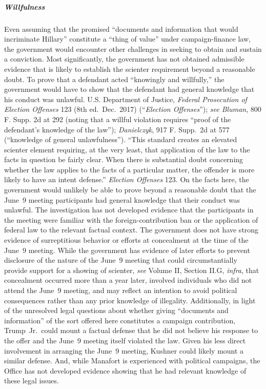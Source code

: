 \subparagraph{Willfulness}
Even assuming that the promised ``documents and information that would incriminate Hillary'' constitute a ``thing of value'' under campaign-finance law, the government would encounter other challenges in seeking to obtain and sustain a conviction.
Most significantly, the government has not obtained admissible evidence that is likely to establish the scienter requirement beyond a reasonable doubt.
To prove that a defendant acted ``knowingly and willfully,'' the government would have to show that the defendant had general knowledge that his conduct was unlawful.
U.S. Department of Justice, \textit{Federal Prosecution of Election Offenses} 123 (8th ed.\ Dec.~2017) (``\textit{Election Offenses}''); \textit{see Bluman}, 800 F. Supp. 2d at 292 (noting that a willful violation requires ``proof of the defendant's knowledge of the law''); \textit{Danielczyk}, 917 F. Supp.~2d at 577 (``knowledge of general unlawfulness'').
``This standard creates an elevated scienter element requiring, at the very least, that application of the law to the facts in question be fairly clear.
When there is substantial doubt concerning whether the law applies to the facts of a particular matter, the offender is more likely to have an intent defense.''
\textit{Election Offenses} 123.
On the facts here, the government would unlikely be able to prove beyond a reasonable doubt that the June~9 meeting participants had general knowledge that their conduct was unlawful.
The investigation has not developed evidence that the participants in the meeting were familiar with the foreign-contribution ban or the application of federal law to the relevant factual context.
The government does not have strong evidence of surreptitious behavior or efforts at concealment at the time of the June~9 meeting.
While the government has evidence of later efforts to prevent disclosure of the nature of the June~9 meeting that could circumstantially provide support for a showing of scienter, \textit{see} Volume II, Section II.G, \textit{infra}, that concealment occurred more than a year later, involved individuals who did not attend the June~9 meeting, and may reflect an intention to avoid political consequences rather than any prior knowledge of illegality.
Additionally, in light of the unresolved legal questions about whether giving ``documents and information'' of the sort offered here constitutes a campaign contribution, Trump~Jr.\ could mount a factual defense that he did not believe his response to the offer and the June~9 meeting itself violated the law.
Given his less direct involvement in arranging the June~9 meeting, Kushner could likely mount a similar defense.
And, while Manafort is experienced with political campaigns, the Office has not developed evidence showing that he had relevant knowledge of these legal issues.

